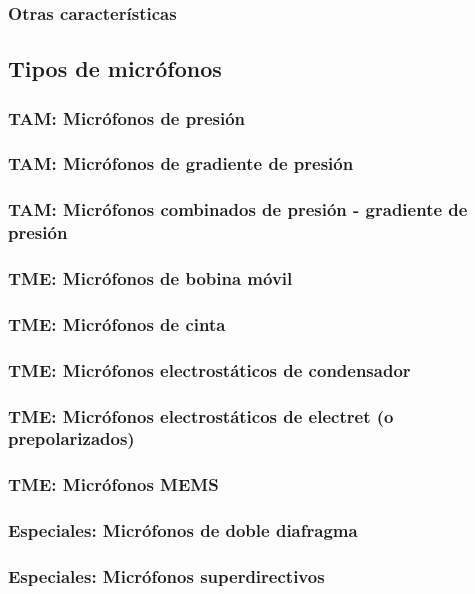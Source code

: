 \documentclass[a4paper, 8pt]{extarticle}
\begin{document}
\begin{multicols}{3}
  \subsubsection{Otras características}

  \subsection{Tipos de micrófonos}
  \subsubsection{TAM: Micrófonos de presión}
  \subsubsection{TAM: Micrófonos de gradiente de presión}
  \subsubsection{TAM: Micrófonos combinados de presión - gradiente de presión}
  \subsubsection{TME: Micrófonos de bobina móvil}
  \subsubsection{TME: Micrófonos de cinta}
  \subsubsection{TME: Micrófonos electrostáticos de condensador}
  \subsubsection{TME: Micrófonos electrostáticos de electret (o prepolarizados)}
  \subsubsection{TME: Micrófonos MEMS}
  \subsubsection{Especiales: Micrófonos de doble diafragma}
  \subsubsection{Especiales: Micrófonos superdirectivos}

\end{multicols}
\end{document}
